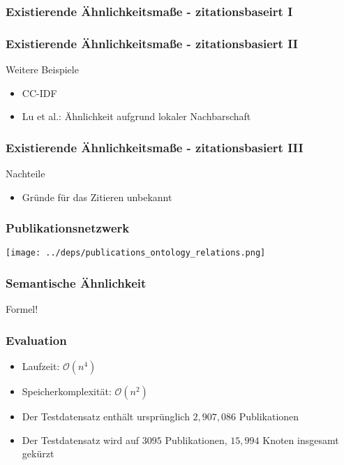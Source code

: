 \documentclass[12pt, xcolor=table]{beamer}
\begin{document}
\begin{frame}
    \frametitle{Existierende Ähnlichkeitsmaße - zitationsbaseirt I}
\end{frame}

\begin{frame}
    \frametitle{Existierende Ähnlichkeitsmaße - zitationsbasiert II}
    \begin{block}{Weitere Beispiele}
    \begin{itemize}
        \item CC-IDF
        \item Lu et al.: Ähnlichkeit aufgrund lokaler Nachbarschaft
    \end{itemize}
    \end{block}
\end{frame}

\begin{frame}
    \frametitle{Existierende Ähnlichkeitsmaße - zitationsbasiert III}
    \begin{block}{Nachteile}
    \begin{itemize}
        \item Gründe für das Zitieren unbekannt
    \end{itemize}
    \end{block}
\end{frame}

\begin{frame}
    \frametitle{Publikationsnetzwerk}
    \begin{center}
        \texttt{[image: ../deps/publications\_ontology\_relations.png]}
    \end{center}
\end{frame}


\begin{frame}
    \frametitle{Semantische Ähnlichkeit}
    Formel!
\end{frame}

\begin{frame}
    \frametitle{Evaluation}
    \begin{itemize}
        \item Laufzeit: $\mathcal{O}(n^4)$
        \item Speicherkomplexität: $\mathcal{O}(n^2)$
        \item Der Testdatensatz enthält ursprünglich $2,907,086$ Publikationen
        \item Der Testdatensatz wird auf $3095$ Publikationen, $15,994$ Knoten insgesamt gekürzt
    \end{itemize}
\end{frame}
\end{document}
